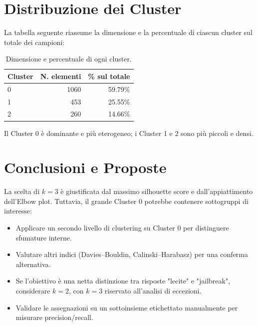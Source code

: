 \documentclass[a4paper,12pt]{article}
\begin{document}
\section{Distribuzione dei Cluster}
La tabella seguente riassume la dimensione e la percentuale di ciascun cluster sul totale dei campioni:
\begin{table}[h!]
  \centering
  \begin{tabular}{lrr}
    \toprule
    Cluster & N. elementi & \% sul totale \\
    \midrule
    0 & 1060 & 59.79\% \\
    1 & 453  & 25.55\% \\
    2 & 260  & 14.66\% \\
    \bottomrule
  \end{tabular}
  \caption{Dimensione e percentuale di ogni cluster.}
  \label{tab:distribution}
\end{table}
Il Cluster 0 è dominante e più eterogeneo; i Cluster 1 e 2 sono più piccoli e densi.

\section{Conclusioni e Proposte}
La scelta di $k=3$ è giustificata dal massimo silhouette score e dall'appiattimento dell'Elbow plot. Tuttavia, il grande Cluster 0 potrebbe contenere sottogruppi di interesse:
\begin{itemize}
  \item Applicare un secondo livello di clustering su Cluster 0 per distinguere sfumature interne.
  \item Valutare altri indici (Davies–Bouldin, Calinski–Harabasz) per una conferma alternativa.
  \item Se l'obiettivo è una netta distinzione tra risposte "lecite" e "jailbreak", considerare $k=2$, con $k=3$ riservato all'analisi di eccezioni.
  \item Validare le assegnazioni su un sottoinsieme etichettato manualmente per misurare precision/recall.
\end{itemize}
\end{document}
